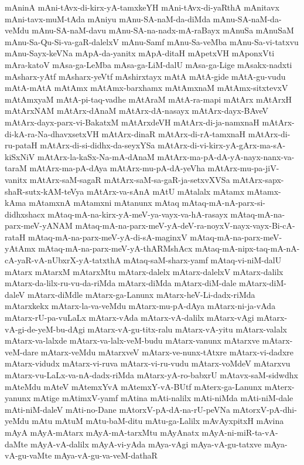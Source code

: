 {mAninA
mAni-tAvx-di-kirx-yA-tamxkeYH
mAni-tAvx-di-yaRthA
mAnitavx
mAni-tavx-muM-tAda
mAniyu
mAnu-SA-naM-da-diMda
mAnu-SA-naM-da-veMdu
mAnu-SA-naM-davu
mAnu-SA-na-nadx-mA-raBayx
mAnuSa
mAnuSaM
mAnu-Sa-Qu-Si-va-gaR-dalelxV
mAnu-Samf
mAnu-Sa-veMba
mAnu-Sa-vi-tatxvu
mAnu-Sayx-keVNa
mApA-da-yanitx
mApA-ditaH
mApetxVH
mAponxVti
mAra-katoV
mAsa-ga-LeMba
mAsa-ga-LiM-dalU
mAsa-ga-Lige
mAsakx-nadxti
mAsharx-yAtf
mAsharx-yeVtf
mAshirxtayx
mAtA
mAtA-gide
mAtA-gu-vudu
mAtA-mAtA
mAtAmx
mAtAmx-barxhamx
mAtAmxnaM
mAtAmx-sitxtevxV
mAtAmxyaM
mAtA-pi-taq-vadhe
mAtAraM
mAtA-ra-mapi
mAtArx
mAtArxH
mAtArxNAM
mAtArx-dAnaM
mAtArx-dA-nasayx
mAtArx-dayx-BAveV
mAtArx-dayx-parx-vi-BakatxM
mAtArxdeVH
mAtArx-di-ja-namxnaH
mAtArx-di-kA-ra-Na-dhavxsetxVH
mAtArx-dinaR
mAtArx-di-rA-tamxnaH
mAtArx-di-ru-pataH
mAtArx-di-si-didhx-da-seyxYSa
mAtArx-di-vi-kirx-yA-gArx-ma-sA-kiSxNiV
mAtArx-la-kaSx-Na-mA-dAnaM
mAtArx-ma-pA-dA-yA-nayx-nanx-va-taraM
mAtArx-ma-pA-dAya
mAtArx-mu-pA-dA-yeVha
mAtArx-mu-pa-jiV-vanitx
mAtArx-saM-sagaR
mAtArx-saM-sa-gaR-ja-setxvXVSa
mAtArx-sapx-shaR-sutx-kAM-teVya
mAtArx-va-sAnA
mAtU
mAtalalx
mAtamx
mAtamx-kAma
mAtamxnA
mAtamxni
mAtanunx
mAtaq
mAtaq-mA-nA-parx-si-didhxshacx
mAtaq-mA-na-kirx-yA-meV-ya-vayx-va-hA-rasayx
mAtaq-mA-na-parx-meV-yANAM
mAtaq-mA-na-parx-meV-yA-deV-ra-noyxV-nayx-vayx-Bi-cA-rataH
mAtaq-mA-na-parx-meV-yA-di-sA-maginxV
mAtaq-mA-na-parx-meV-yAtAmx
mAtaq-mA-na-parx-meV-yA-thARMshAcx
mAtaq-mA-nipx-taq-mA-nA-cA-yaR-vA-nUbxrX-yA-tatxthA
mAtaq-saM-sharx-yamf
mAtaq-vi-niM-dalU
mAtarx
mAtarxM
mAtarxMtu
mAtarx-dalelx
mAtarx-dalelxV
mAtarx-dalilx
mAtarx-da-lilx-ru-vu-da-riMda
mAtarx-diMda
mAtarx-diM-dale
mAtarx-diM-daleV
mAtarx-diMdle
mAtarx-ga-Lanunx
mAtarx-heV-Li-dadx-riMda
mAtarxkekx
mAtarx-la-va-veMdu
mAtarx-mu-pA-dAya
mAtarx-ni-ja-vAda
mAtarx-rU-pa-vuLaLx
mAtarx-vAda
mAtarx-vA-dalilx
mAtarx-vAgi
mAtarx-vA-gi-de-yeM-bu-dAgi
mAtarx-vA-gu-titx-ralu
mAtarx-vA-yitu
mAtarx-valalx
mAtarx-va-lalxde
mAtarx-va-lalx-veM-budu
mAtarx-vanunx
mAtarxve
mAtarx-veM-dare
mAtarx-veMdu
mAtarxveV
mAtarx-ve-nunx-tAtxre
mAtarx-vi-dadxre
mAtarx-vidudx
mAtarx-vi-ruva
mAtarx-vi-ru-vudu
mAtarx-voMdeV
mAtarxvu
mAtarx-vu-LaLx-va-nA-dadx-riMda
mAtarx-yA-ro-babxrU
mAtavx-saM-sidwdhx
mAteMdu
mAteV
mAtemxYvA
mAtemxY-vA-BUtf
mAterx-ga-Lanunx
mAterx-yanunx
mAtige
mAtimxV-yamf
mAtina
mAti-nalilx
mAti-niMda
mAti-niM-dale
mAti-niM-daleV
mAti-no-Dane
mAtorxV-pA-dA-na-rU-peVNa
mAtorxV-pA-dhi-yeMdu
mAtu
mAtuM
mAtu-baM-ditu
mAtu-ga-Lalilx
mAvAyxpitxH
mAvina
mAyA
mAyA-mAtarx
mAyA-mA-tarxMtu
mAyAnatx
mAyA-ni-miR-ta-vA-daMte
mAyA-vA-dalilx
mAyA-vi-yAda
mAya-vAgi
mAya-vA-gu-tatxve
mAya-vA-gu-vaMte
mAya-vA-gu-va-veM-dathaR
}
